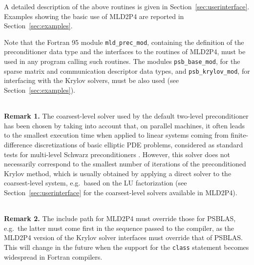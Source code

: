 A detailed description of the above routines is given in Section~\ref{sec:userinterface}.
Examples showing the basic use of MLD2P4 are reported in Section~\ref{sec:examples}.

Note that the Fortran 95 module \verb|mld_prec_mod|, containing the definition of the 
preconditioner data type and the interfaces to the routines of MLD2P4,
must be used in any program calling such routines.
The modules \verb|psb_base_mod|, for the sparse matrix and communication descriptor
data types, and \verb|psb_krylov_mod|, for interfacing with the
Krylov solvers, must be also used (see Section~\ref{sec:examples}).

\ \\
\textbf{Remark 1.} The coarsest-level solver used by the default two-level
preconditioner has been chosen by taking into account that, on parallel
machines, it often leads to the smallest execution time when applied to
linear systems coming from finite-difference discretizations of basic
elliptic PDE problems, considered as standard tests for multi-level Schwarz
preconditioners \cite{aaecc_07,apnum_07}. However, this solver does
not necessarily correspond to the smallest number of iterations of the
preconditioned Krylov method, which is usually obtained by applying
a direct solver to the coarsest-level system, e.g.\ based on the LU
factorization (see Section~\ref{sec:userinterface}
for the coarsest-level solvers available in MLD2P4). 

\ \\
\textbf{Remark 2.} The include path for MLD2P4 must override
those for PSBLAS, e.g.\ the latter must come first in the sequence
passed to the compiler, as the MLD2P4 version of the Krylov solver
interfaces must override that of PSBLAS. This will change in the future
when the support for the \verb|class| statement becomes widespread in Fortran
compilers. 


